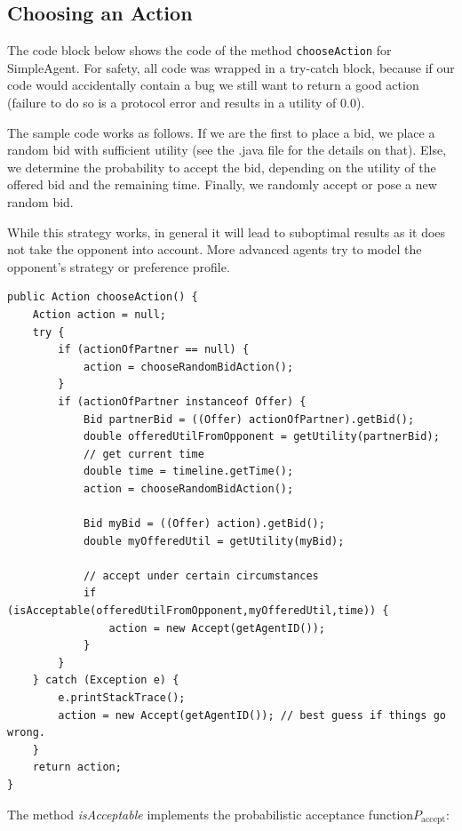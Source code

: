 \documentclass[]{article}
\begin{document}
\subsection{Choosing an Action}
The code block below shows the code of the method \texttt{chooseAction} for SimpleAgent. For safety, all code was wrapped in a try-catch block, because if our code would accidentally contain a bug we still want to return a good action (failure to do so is a protocol error and results in a utility of 0.0).

The sample code works as follows. If we are the first to place a bid, we place a random bid with sufficient utility (see the .java file for the details on that). Else, we determine the probability to accept the bid, depending on the utility of the offered bid and the remaining time. Finally, we randomly accept or pose a new random bid.

While this strategy works, in general it will lead to suboptimal results as it does not take the opponent into account. More advanced agents try to model the opponent's strategy or preference profile.

\begin{lstlisting}
public Action chooseAction() {
	Action action = null;
	try { 
		if (actionOfPartner == null) {
			action = chooseRandomBidAction();
		}
		if (actionOfPartner instanceof Offer) {
			Bid partnerBid = ((Offer) actionOfPartner).getBid();
			double offeredUtilFromOpponent = getUtility(partnerBid);
			// get current time
			double time = timeline.getTime();
			action = chooseRandomBidAction();
			
			Bid myBid = ((Offer) action).getBid();
			double myOfferedUtil = getUtility(myBid);
			
			// accept under certain circumstances
			if (isAcceptable(offeredUtilFromOpponent,myOfferedUtil,time)) {
				action = new Accept(getAgentID());
			}
		}
	} catch (Exception e) { 
		e.printStackTrace();
		action = new Accept(getAgentID()); // best guess if things go wrong. 
	}
	return action;
}
\end{lstlisting}

The method \textit{isAcceptable} implements the probabilistic acceptance function$P_\text{accept}$:
\end{document}
